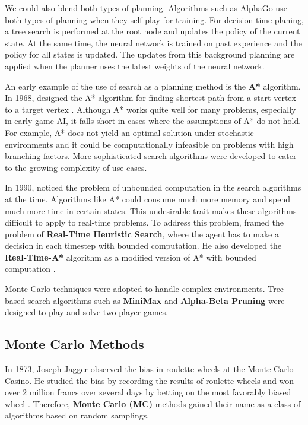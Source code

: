We could also blend both types of planning.
Algorithms such as AlphaGo use both types of planning when they self-play for training.
For decision-time planing, a tree search is performed at the root node and updates the policy of the current state.
At the same time, the neural network is trained on past experience and the policy for all states is updated.
The updates from this background planning are applied when the planner uses the latest weights of the neural network.


An early example of the use of search as a planning method is the \textbf{A*} algorithm.
In 1968, \citeauthor{FormalBasisHeuristic_Hart.Nilsson.ea_1968} designed the A* algorithm for finding shortest path from a start vertex to a target vertex \cite{FormalBasisHeuristic_Hart.Nilsson.ea_1968}.
Although A* works quite well for many problems, especially in early game AI, it falls short in cases where the assumptions of A* do not hold.
For example, A* does not yield an optimal solution under stochastic environments and it could be computationally infeasible on problems with high branching factors.
More sophisticated search algorithms were developed to cater to the growing complexity of use cases.

In 1990, \citeauthor{RealtimeHeuristicSearch_Korf_1990} noticed the problem of unbounded computation in the search algorithms at the time.
Algorithms like A* could consume much more memory and spend much more time in certain states.
This undesirable trait makes these algorithms difficult to apply to real-time problems.
To address this problem, \citeauthor{RealtimeHeuristicSearch_Korf_1990} framed the problem of \textbf{Real-Time Heuristic Search},
where the agent has to make a decision in each timestep with bounded computation.
He also developed the \textbf{Real-Time-A*} algorithm as a modified version of A* with bounded computation \cite{RealtimeHeuristicSearch_Korf_1990}.

Monte Carlo techniques were adopted to handle complex environments.
Tree-based search algorithms such as \textbf{MiniMax} and \textbf{Alpha-Beta Pruning} were designed to play and solve two-player games.

\subsection{Monte Carlo Methods}
In 1873, Joseph Jagger observed the bias in roulette wheels at the Monte Carlo Casino.
He studied the bias by recording the results of roulette wheels and won over 2 million francs over several days by betting on the most favorably biased wheel \cite{MonteCarloCasino__2022}.
Therefore, \textbf{Monte Carlo (MC)} methods gained their name as a class of algorithms based on random samplings.


